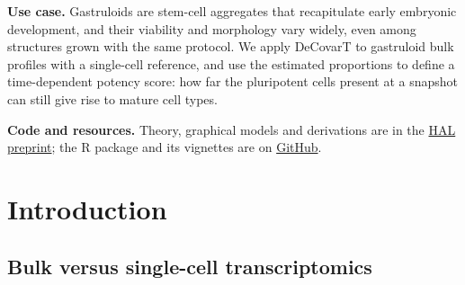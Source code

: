 \documentclass[pdflatex, sn-nature]{sn-jnl}
\theoremstyle{thmstyleone}%
\theoremstyle{thmstyletwo}%
\theoremstyle{thmstylethree}%
\begin{document}
{        \textbf{Use case.}
        Gastruloids are stem-cell aggregates that recapitulate early embryonic
        development, and their viability and morphology vary widely, even among
        structures grown with the same protocol.
        We apply DeCovarT to gastruloid bulk profiles with a single-cell reference, and
        use the estimated proportions to define a time-dependent potency score: how far
        the pluripotent cells present at a snapshot can still give rise to mature cell
        types.

        \textbf{Code and resources.}
        Theory, graphical models and derivations are in the
        \href{https://cnrs.hal.science/hal-04208010}{HAL preprint};
        the R package and its vignettes are on
        \href{https://github.com/bastienchassagnol/DeCovarT}{GitHub}.
        }


    \maketitle

\section{Introduction}
\label{sec:intro}

\subsection{Bulk versus single-cell transcriptomics}
\label{sec:context}
\end{document}
